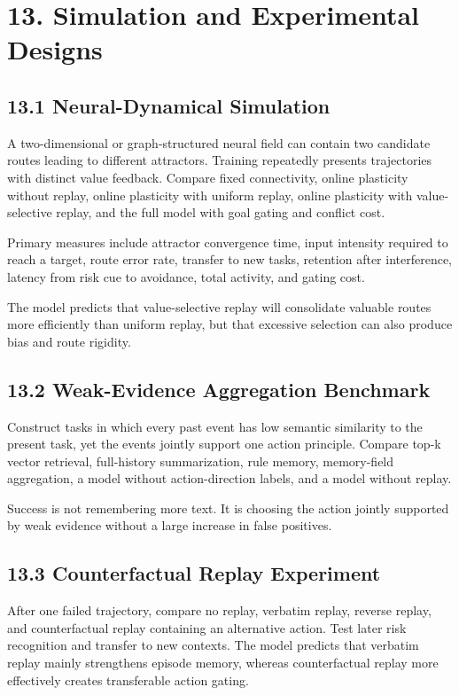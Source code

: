 \documentclass[11pt, a4paper]{article}
\begin{document}
\section{13. Simulation and Experimental Designs}

\subsection{13.1 Neural-Dynamical Simulation}

A two-dimensional or graph-structured neural field can contain two candidate routes leading to different attractors. Training repeatedly presents trajectories with distinct value feedback. Compare fixed connectivity, online plasticity without replay, online plasticity with uniform replay, online plasticity with value-selective replay, and the full model with goal gating and conflict cost.

Primary measures include attractor convergence time, input intensity required to reach a target, route error rate, transfer to new tasks, retention after interference, latency from risk cue to avoidance, total activity, and gating cost.

The model predicts that value-selective replay will consolidate valuable routes more efficiently than uniform replay, but that excessive selection can also produce bias and route rigidity.

\subsection{13.2 Weak-Evidence Aggregation Benchmark}

Construct tasks in which every past event has low semantic similarity to the present task, yet the events jointly support one action principle. Compare top-k vector retrieval, full-history summarization, rule memory, memory-field aggregation, a model without action-direction labels, and a model without replay.

Success is not remembering more text. It is choosing the action jointly supported by weak evidence without a large increase in false positives.

\subsection{13.3 Counterfactual Replay Experiment}

After one failed trajectory, compare no replay, verbatim replay, reverse replay, and counterfactual replay containing an alternative action. Test later risk recognition and transfer to new contexts. The model predicts that verbatim replay mainly strengthens episode memory, whereas counterfactual replay more effectively creates transferable action gating.
\end{document}
